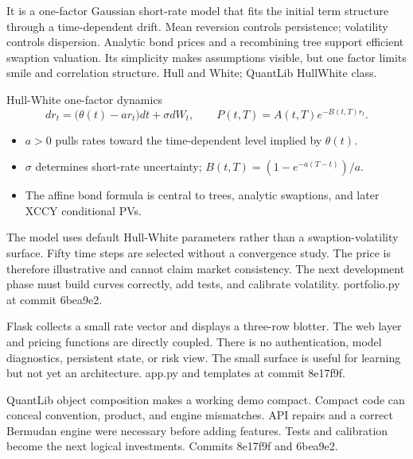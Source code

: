 {It is a one-factor Gaussian short-rate model that fits the initial term structure through a time-dependent drift.}
{Mean reversion controls persistence; volatility controls dispersion.}
{Analytic bond prices and a recombining tree support efficient swaption valuation.}
{Its simplicity makes assumptions visible, but one factor limits smile and correlation structure.}
{Hull and White; QuantLib HullWhite class.}

\begin{frame}{Hull-White one-factor dynamics}
  \[
    dr_t=\bigl(\theta(t)-a r_t\bigr)dt+\sigma dW_t,
    \qquad
    P(t,T)=A(t,T)e^{-B(t,T)r_t}.
  \]
  \begin{itemize}\setlength\itemsep{0.8em}
    \item $a>0$ pulls rates toward the time-dependent level implied by $\theta(t)$.
    \item $\sigma$ determines short-rate uncertainty; $B(t,T)=(1-e^{-a(T-t)})/a$.
    \item The affine bond formula is central to trees, analytic swaptions, and later XCCY conditional PVs.
  \end{itemize}
\end{frame}

{The model uses default Hull-White parameters rather than a swaption-volatility surface.}
{Fifty time steps are selected without a convergence study.}
{The price is therefore illustrative and cannot claim market consistency.}
{The next development phase must build curves correctly, add tests, and calibrate volatility.}
{portfolio.py at commit 6bea9e2.}

{Flask collects a small rate vector and displays a three-row blotter.}
{The web layer and pricing functions are directly coupled.}
{There is no authentication, model diagnostics, persistent state, or risk view.}
{The small surface is useful for learning but not yet an architecture.}
{app.py and templates at commit 8e17f9f.}

{QuantLib object composition makes a working demo compact.}
{Compact code can conceal convention, product, and engine mismatches.}
{API repairs and a correct Bermudan engine were necessary before adding features.}
{Tests and calibration become the next logical investments.}
{Commits 8e17f9f and 6bea9e2.}

